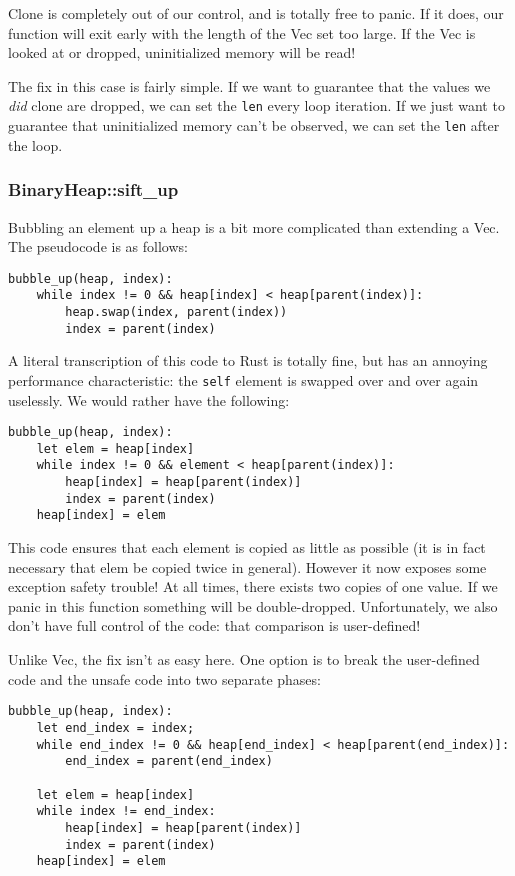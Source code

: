 \documentclass[a4paper,]{book}
\begin{document}
Clone is completely out of our control, and is totally free to panic. If
it does, our function will exit early with the length of the Vec set too
large. If the Vec is looked at or dropped, uninitialized memory will be
read!

The fix in this case is fairly simple. If we want to guarantee that the
values we \emph{did} clone are dropped, we can set the \texttt{len}
every loop iteration. If we just want to guarantee that uninitialized
memory can't be observed, we can set the \texttt{len} after the loop.

\subsubsection{BinaryHeap::sift\_up}\label{binaryheapsiftux5fup}

Bubbling an element up a heap is a bit more complicated than extending a
Vec. The pseudocode is as follows:

\begin{verbatim}
bubble_up(heap, index):
    while index != 0 && heap[index] < heap[parent(index)]:
        heap.swap(index, parent(index))
        index = parent(index)
\end{verbatim}

A literal transcription of this code to Rust is totally fine, but has an
annoying performance characteristic: the \texttt{self} element is
swapped over and over again uselessly. We would rather have the
following:

\begin{verbatim}
bubble_up(heap, index):
    let elem = heap[index]
    while index != 0 && element < heap[parent(index)]:
        heap[index] = heap[parent(index)]
        index = parent(index)
    heap[index] = elem
\end{verbatim}

This code ensures that each element is copied as little as possible (it
is in fact necessary that elem be copied twice in general). However it
now exposes some exception safety trouble! At all times, there exists
two copies of one value. If we panic in this function something will be
double-dropped. Unfortunately, we also don't have full control of the
code: that comparison is user-defined!

Unlike Vec, the fix isn't as easy here. One option is to break the
user-defined code and the unsafe code into two separate phases:

\begin{verbatim}
bubble_up(heap, index):
    let end_index = index;
    while end_index != 0 && heap[end_index] < heap[parent(end_index)]:
        end_index = parent(end_index)

    let elem = heap[index]
    while index != end_index:
        heap[index] = heap[parent(index)]
        index = parent(index)
    heap[index] = elem
\end{verbatim}
\end{document}
